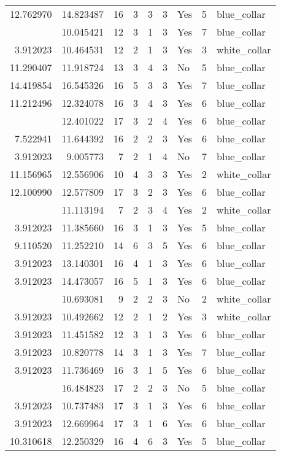 \documentclass[
]{article}
\begin{document}
\begin{longtable}[t]{rrrrrllrl}
12.762970 & 14.823487 & 16 & 3 & 3 & 3 & Yes & 5 & blue\_collar\\
\addlinespace
3.912023 & 10.045421 & 12 & 3 & 1 & 3 & Yes & 7 & blue\_collar\\
3.912023 & 10.464531 & 12 & 2 & 1 & 3 & Yes & 3 & white\_collar\\
11.290407 & 11.918724 & 13 & 3 & 4 & 3 & No & 5 & blue\_collar\\
14.419854 & 16.545326 & 16 & 5 & 3 & 3 & Yes & 7 & blue\_collar\\
11.212496 & 12.324078 & 16 & 3 & 4 & 3 & Yes & 6 & blue\_collar\\
\addlinespace
10.492662 & 12.401022 & 17 & 3 & 2 & 4 & Yes & 6 & blue\_collar\\
7.522941 & 11.644392 & 16 & 2 & 2 & 3 & Yes & 6 & blue\_collar\\
3.912023 & 9.005773 & 7 & 2 & 1 & 4 & No & 7 & blue\_collar\\
11.156965 & 12.556906 & 10 & 4 & 3 & 3 & Yes & 2 & white\_collar\\
12.100990 & 12.577809 & 17 & 3 & 2 & 3 & Yes & 6 & blue\_collar\\
\addlinespace
4.094345 & 11.113194 & 7 & 2 & 3 & 4 & Yes & 2 & white\_collar\\
3.912023 & 11.385660 & 16 & 3 & 1 & 3 & Yes & 5 & blue\_collar\\
9.110520 & 11.252210 & 14 & 6 & 3 & 5 & Yes & 6 & blue\_collar\\
3.912023 & 13.140301 & 16 & 4 & 1 & 3 & Yes & 6 & blue\_collar\\
3.912023 & 14.473057 & 16 & 5 & 1 & 3 & Yes & 6 & blue\_collar\\
\addlinespace
7.718686 & 10.693081 & 9 & 2 & 2 & 3 & No & 2 & white\_collar\\
3.912023 & 10.492662 & 12 & 2 & 1 & 2 & Yes & 3 & white\_collar\\
3.912023 & 11.451582 & 12 & 3 & 1 & 3 & Yes & 6 & blue\_collar\\
3.912023 & 10.820778 & 14 & 3 & 1 & 3 & Yes & 7 & blue\_collar\\
3.912023 & 11.736469 & 16 & 3 & 1 & 5 & Yes & 6 & blue\_collar\\
\addlinespace
16.811245 & 16.484823 & 17 & 2 & 2 & 3 & No & 5 & blue\_collar\\
3.912023 & 10.737483 & 17 & 3 & 1 & 3 & Yes & 6 & blue\_collar\\
3.912023 & 12.669964 & 17 & 3 & 1 & 6 & Yes & 6 & blue\_collar\\
10.310618 & 12.250329 & 16 & 4 & 6 & 3 & Yes & 5 & blue\_collar\\

\end{longtable}
\end{document}
